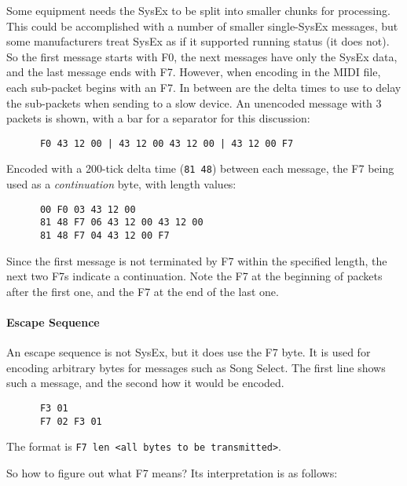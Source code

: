    Some equipment needs the SysEx to be split into smaller chunks for
   processing.
   This could be accomplished with a number of smaller single-SysEx messages,
   but some manufacturers treat SysEx as if it supported running status (it
   does not).
   So the first message starts with F0, the next messages have only the SysEx
   data, and the last message ends with F7.
   However, when encoding in the MIDI file, each sub-packet begins with
   an F7.
   In between are the delta times to use to delay the sub-packets when sending
   to a slow device.
   An unencoded message with 3 packets is shown,
   with a bar for a separator for this discussion:

   \begin{verbatim}
      F0 43 12 00 | 43 12 00 43 12 00 | 43 12 00 F7
   \end{verbatim}

   Encoded with a 200-tick delta time (\texttt{81 48}) between each message,
   the F7 being used as a \textsl{continuation} byte, with length values:

   \begin{verbatim}
      00 F0 03 43 12 00
      81 48 F7 06 43 12 00 43 12 00
      81 48 F7 04 43 12 00 F7
   \end{verbatim}

   Since the first message is not terminated by F7 within the specified
   length, the next two F7s indicate a continuation.
   Note the F7 at the beginning of packets after the first one, and
   the F7 at the end of the last one.

\paragraph{Escape Sequence}
\label{paragraph:patterns_escape_sequence}

   An escape sequence is not SysEx, but it does use the F7 byte.
   It is used for encoding arbitrary bytes for messages such as Song Select.
   The first line shows such a message, and the second how it would be encoded.

   \begin{verbatim}
      F3 01
      F7 02 F3 01
   \end{verbatim}

   The format is \texttt{F7 len <all bytes to be transmitted>}.

   So how to figure out what F7 means?
   Its interpretation is as follows:

